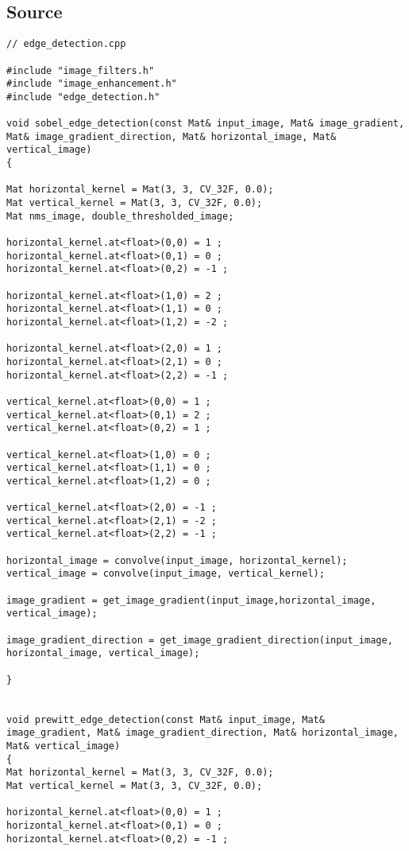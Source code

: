 \subsection{Source}
\begin{lstlisting}
// edge_detection.cpp

#include "image_filters.h"
#include "image_enhancement.h"
#include "edge_detection.h"

void sobel_edge_detection(const Mat& input_image, Mat& image_gradient, Mat& image_gradient_direction, Mat& horizontal_image, Mat& vertical_image)
{

Mat horizontal_kernel = Mat(3, 3, CV_32F, 0.0);
Mat vertical_kernel = Mat(3, 3, CV_32F, 0.0);
Mat nms_image, double_thresholded_image;

horizontal_kernel.at<float>(0,0) = 1 ;
horizontal_kernel.at<float>(0,1) = 0 ;
horizontal_kernel.at<float>(0,2) = -1 ;

horizontal_kernel.at<float>(1,0) = 2 ;
horizontal_kernel.at<float>(1,1) = 0 ;
horizontal_kernel.at<float>(1,2) = -2 ;

horizontal_kernel.at<float>(2,0) = 1 ;
horizontal_kernel.at<float>(2,1) = 0 ;
horizontal_kernel.at<float>(2,2) = -1 ;

vertical_kernel.at<float>(0,0) = 1 ;
vertical_kernel.at<float>(0,1) = 2 ;
vertical_kernel.at<float>(0,2) = 1 ;

vertical_kernel.at<float>(1,0) = 0 ;
vertical_kernel.at<float>(1,1) = 0 ;
vertical_kernel.at<float>(1,2) = 0 ;

vertical_kernel.at<float>(2,0) = -1 ;
vertical_kernel.at<float>(2,1) = -2 ;
vertical_kernel.at<float>(2,2) = -1 ;

horizontal_image = convolve(input_image, horizontal_kernel); 
vertical_image = convolve(input_image, vertical_kernel); 

image_gradient = get_image_gradient(input_image,horizontal_image, vertical_image);

image_gradient_direction = get_image_gradient_direction(input_image, horizontal_image, vertical_image);

}


void prewitt_edge_detection(const Mat& input_image, Mat& image_gradient, Mat& image_gradient_direction, Mat& horizontal_image, Mat& vertical_image)
{
Mat horizontal_kernel = Mat(3, 3, CV_32F, 0.0);
Mat vertical_kernel = Mat(3, 3, CV_32F, 0.0);

horizontal_kernel.at<float>(0,0) = 1 ;
horizontal_kernel.at<float>(0,1) = 0 ;
horizontal_kernel.at<float>(0,2) = -1 ;


\end{lstlisting}
